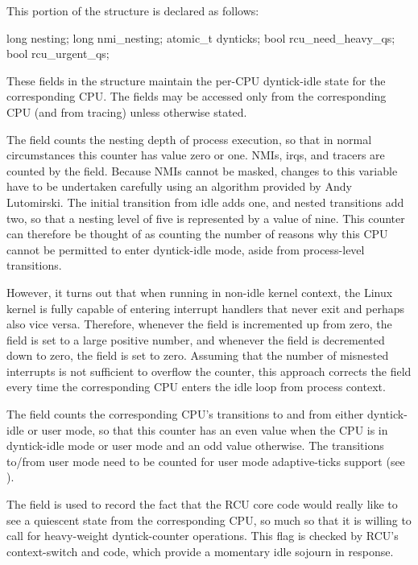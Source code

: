 This portion of the  structure is declared as follows:

\begin{VerbatimN}
		long nesting;
		long nmi_nesting;
		atomic_t dynticks;
		bool rcu_need_heavy_qs;
		bool rcu_urgent_qs;
\end{VerbatimN}

These fields in the  structure maintain the per-CPU dyntick-idle
state for the corresponding CPU\@.
The fields may be accessed only from
the corresponding CPU (and from tracing) unless otherwise stated.

The  field counts the nesting depth of process
execution, so that in normal circumstances this counter has value zero
or one.
NMIs, irqs, and tracers are counted by the
 field.
Because NMIs cannot be masked, changes
to this variable have to be undertaken carefully using an algorithm
provided by Andy Lutomirski.
The initial transition from idle adds one,
and nested transitions add two, so that a nesting level of five is
represented by a  value of nine.
This counter
can therefore be thought of as counting the number of reasons why this
CPU cannot be permitted to enter dyntick-idle mode, aside from
process-level transitions.

However, it turns out that when running in non-idle kernel context, the
Linux kernel is fully capable of entering interrupt handlers that never
exit and perhaps also vice versa.
Therefore, whenever the
 field is incremented up from zero, the
 field is set to a large positive number, and
whenever the  field is decremented down to zero,
the  field is set to zero.
Assuming that
the number of misnested interrupts is not sufficient to overflow the
counter, this approach corrects the  field
every time the corresponding CPU enters the idle loop from process
context.

The  field counts the corresponding CPU's transitions to
and from either dyntick-idle or user mode, so that this counter has an
even value when the CPU is in dyntick-idle mode or user mode and an odd
value otherwise.
The transitions to/from user mode need to be counted
for user mode adaptive-ticks support (see ).

The  field is used to record the fact that the
RCU core code would really like to see a quiescent state from the
corresponding CPU, so much so that it is willing to call for
heavy-weight dyntick-counter operations.
This flag is checked by RCU's
context-switch and  code, which provide a momentary
idle sojourn in response.

